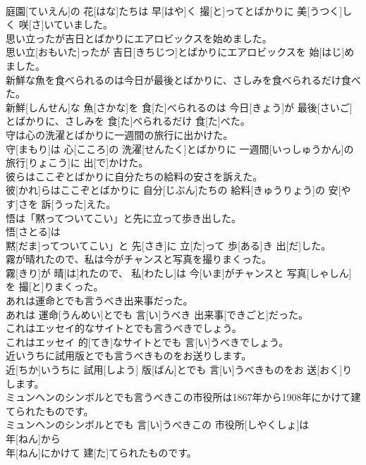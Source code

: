 \documentclass[8pt]{extreport}
\begin{document}
\begin{CJK}{UTF8}{min}
\\	庭園[ていえん]の 花[はな]たちは 早[はや]く 撮[と]ってとばかりに 美[うつく]しく 咲[さ]いていました。
\\	思い立ったが吉日とばかりにエアロビックスを始めました。	
\\	思い立[おもいた]ったが 吉日[きちじつ]とばかりにエアロビックスを 始[はじ]めました。
\\	新鮮な魚を食べられるのは今日が最後とばかりに、さしみを食べられるだけ食べた。	
\\	新鮮[しんせん]な 魚[さかな]を 食[た]べられるのは 今日[きょう]が 最後[さいご]とばかりに、さしみを 食[た]べられるだけ 食[た]べた。
\\	守は心の洗濯とばかりに一週間の旅行に出かけた。	
\\	守[まもり]は 心[こころ]の 洗濯[せんたく]とばかりに 一週間[いっしゅうかん]の 旅行[りょこう]に 出[で]かけた。
\\	彼らはここぞとばかりに自分たちの給料の安さを訴えた。	
\\	彼[かれ]らはここぞとばかりに 自分[じぶん]たちの 給料[きゅうりょう]の 安[やす]さを 訴[うった]えた。
\\	悟は「黙ってついてこい」と先に立って歩き出した。	
\\	悟[さとる]は
\\	黙[だま]ってついてこい」と 先[さき]に 立[た]って 歩[ある]き 出[だ]した。
\\	霧が晴れたので、私は今がチャンスと写真を撮りまくった。	
\\	霧[きり]が 晴[は]れたので、 私[わたし]は 今[いま]がチャンスと 写真[しゃしん]を 撮[と]りまくった。
\\	あれは運命とでも言うべき出来事だった。	
\\	あれは 運命[うんめい]とでも 言[い]うべき 出来事[できごと]だった。
\\	これはエッセイ的なサイトとでも言うべきでしょう。	
\\	これはエッセイ 的[てき]なサイトとでも 言[い]うべきでしょう。
\\	近いうちに試用版とでも言うべきものをお送りします。	
\\	近[ちか]いうちに 試用[しよう] 版[ばん]とでも 言[い]うべきものをお 送[おく]りします。
\\	ミュンヘンのシンボルとでも言うべきこの市役所は1867年から1908年にかけて建てられたものです。	
\\	ミュンヘンのシンボルとでも 言[い]うべきこの 市役所[しやくしょ]は 
\\	年[ねん]から 
\\	年[ねん]にかけて 建[た]てられたものです。

\end{CJK}
\end{document}

